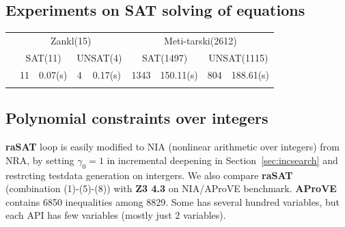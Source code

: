 \documentclass[runningheads,a4paper,oribibl]{llncs}
\begin{document}
\subsection{Experiments on SAT solving of equations}
\begin{table}[h]
\begin{tabular}{lclclclcl}
\cline{2-9}
\multicolumn{1}{l|}{} & \multicolumn{4}{c|}{Zankl(15)}                                                                                 & \multicolumn{4}{c|}{Meti-tarski(2612)}                                                                                 \\ \cline{2-9} 
\multicolumn{1}{l|}{} & \multicolumn{2}{c|}{SAT(11)}                           & \multicolumn{2}{c|}{UNSAT(4)}                         & \multicolumn{2}{c|}{SAT(1497)}                             & \multicolumn{2}{c|}{UNSAT(1115)}                          \\ \cline{2-9} 
\multicolumn{1}{l|}{} & \multicolumn{1}{c|}{11} & \multicolumn{1}{c|}{0.07(s)} & \multicolumn{1}{c|}{4} & \multicolumn{1}{c|}{0.17(s)} & \multicolumn{1}{c|}{1343} & \multicolumn{1}{c|}{150.11(s)} & \multicolumn{1}{c|}{804} & \multicolumn{1}{c|}{188.61(s)} \\ \cline{2-9} 
                      & \multicolumn{1}{l}{}    &                              & \multicolumn{1}{l}{}   &                              & \multicolumn{1}{l}{}      &                                & \multicolumn{1}{l}{}     &                               
\end{tabular}
\end{table}

\subsection{Polynomial constraints over integers} \label{sec:NIA}

{\bf raSAT} loop is easily modified to NIA (nonlinear arithmetic over integers) from NRA, 
by setting $\gamma_0 = 1$ in incremental deepening in Section~\ref{sec:incsearch} 
and restrcting testdata generation on intergers. 
We also compare {\bf raSAT} (combination (1)-(5)-(8)) with {\bf Z3 4.3} on NIA/AProVE benchmark. 
{\bf AProVE} contains 6850 inequalities among 8829. 
Some has several hundred variables, but each API has few variables (mostly just 2 variables). 
\end{document}
